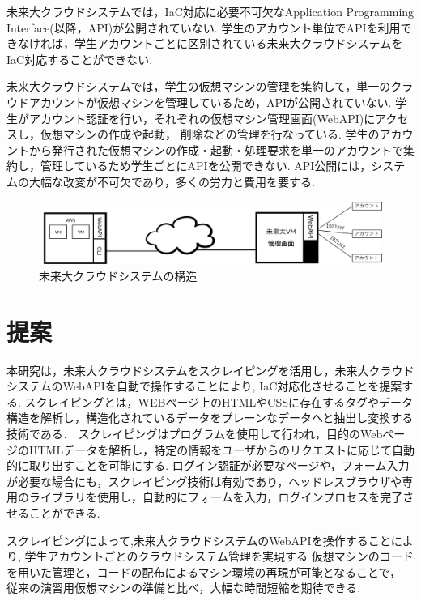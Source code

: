 \documentclass[11pt]{ujarticle}\sloppy
\begin{document}
未来大クラウドシステムでは，IaC対応に必要不可欠なApplication Programming Interface(以降，API)が公開されていない.
学生のアカウント単位でAPIを利用できなければ，学生アカウントごとに区別されている未来大クラウドシステムをIaC対応することができない.

未来大クラウドシステムでは，学生の仮想マシンの管理を集約して，単一のクラウドアカウントが仮想マシンを管理しているため，APIが公開されていない.
学生がアカウント認証を行い，それぞれの仮想マシン管理画面(WebAPI)にアクセスし，仮想マシンの作成や起動， 削除などの管理を行なっている.
学生のアカウントから発行された仮想マシンの作成・起動・処理要求を単一のアカウントで集約し，管理しているため学生ごとにAPIを公開できない.
API公開には，システムの大幅な改変が不可欠であり，多くの労力と費用を要する.



\begin{figure}[h]
	\includegraphics[width=1\linewidth，height=2cm]{./images/cloud.png}
	\caption{未来大クラウドシステムの構造}
	\label{fig:cloud}
\end{figure}



\section{提案}


本研究は，未来大クラウドシステムをスクレイピングを活用し，未来大クラウドシステムのWebAPIを自動で操作することにより,
IaC対応化させることを提案する.
スクレイピングとは，WEBページ上のHTMLやCSSに存在するタグやデータ構造を解析し，構造化されているデータをプレーンなデータへと抽出し変換する技術である．
スクレイピングはプログラムを使用して行われ，目的のWebページのHTMLデータを解析し，特定の情報をユーザからのリクエストに応じて自動的に取り出すことを可能にする.
ログイン認証が必要なページや，フォーム入力が必要な場合にも，スクレイピング技術は有効であり，ヘッドレスブラウザや専用のライブラリを使用し，自動的にフォームを入力，ログインプロセスを完了させることができる.

スクレイピングによって,未来大クラウドシステムのWebAPIを操作することにより,
学生アカウントごとのクラウドシステム管理を実現する
仮想マシンのコードを用いた管理と，コードの配布によるマシン環境の再現が可能となることで，
従来の演習用仮想マシンの準備と比べ，大幅な時間短縮を期待できる.
\end{document}
